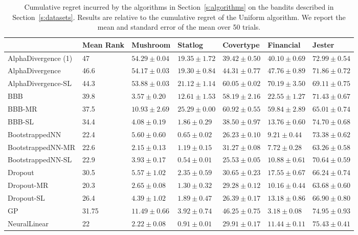 \documentclass{article} \usepackage{iclr2018_conference,times}
\begin{document}
\begin{table}[ht]
  \caption{Cumulative regret incurred by the algorithms in Section~\ref{s:algorithms} on the bandits described in Section~\ref{s:datasets}. Results are relative to the cumulative regret of the Uniform algorithm. We report the mean and standard error of the mean over 50 trials.}
  \label{tab:nonlinear_cum_regret_main}
  \centering
  \footnotesize
  \tiny
  \begin{tabular}{lllllll}
& Mean Rank & Mushroom & Statlog & Covertype & Financial & Jester \\
\midrule
AlphaDivergence (1) & 47& $54.29 \pm 0.04$& $19.35 \pm 1.72$& $39.42 \pm 0.50$& $40.10 \pm 0.69$& $72.99 \pm 0.54$ \\
AlphaDivergence & 46.6& $54.17 \pm 0.03$& $19.30 \pm 0.84$& $44.31 \pm 0.77$& $47.76 \pm 0.89$& $71.86 \pm 0.72$ \\
AlphaDivergence-SL & 44.3& $53.88 \pm 0.03$& $21.12 \pm 1.14$& $60.05 \pm 0.02$& $70.19 \pm 3.50$& $69.11 \pm 0.75$ \\
BBB & 39.8& $3.57 \pm 0.20$& $12.61 \pm 1.53$& $58.19 \pm 2.16$& $22.55 \pm 1.27$& $71.43 \pm 0.67$ \\
BBB-MR & 37.5& $10.93 \pm 2.69$& $25.29 \pm 0.00$& $60.92 \pm 0.55$& $59.84 \pm 2.89$& $65.01 \pm 0.74$ \\
BBB-SL & 34.4& $4.08 \pm 0.19$& $1.86 \pm 0.29$& $38.50 \pm 0.97$& $13.76 \pm 0.60$& $74.70 \pm 0.68$ \\
BootstrappedNN & 22.4& $5.60 \pm 0.60$& $0.65 \pm 0.02$& $26.23 \pm 0.10$& $9.21 \pm 0.44$& $73.38 \pm 0.62$ \\
BootstrappedNN-MR & 22.6& $2.15 \pm 0.13$& $1.19 \pm 0.15$& $31.27 \pm 0.08$& $7.72 \pm 0.28$& $63.26 \pm 0.58$ \\
BootstrappedNN-SL & 22.9& $3.93 \pm 0.17$& $0.54 \pm 0.01$& $25.53 \pm 0.05$& $10.88 \pm 0.61$& $70.64 \pm 0.59$ \\
Dropout & 30.5& $5.57 \pm 1.02$& $2.35 \pm 0.59$& $30.65 \pm 0.23$& $17.55 \pm 0.67$& $66.24 \pm 0.74$ \\
Dropout-MR & 20.3& $2.65 \pm 0.08$& $1.30 \pm 0.32$& $29.28 \pm 0.12$& $10.16 \pm 0.44$& $63.68 \pm 0.60$ \\
Dropout-SL & 26.4& $4.39 \pm 1.02$& $1.89 \pm 0.47$& $26.39 \pm 0.17$& $13.18 \pm 0.86$& $66.90 \pm 0.80$ \\
GP & 31.75& $11.49 \pm 0.66$& $3.92 \pm 0.74$& $46.25 \pm 0.75$& $3.18 \pm 0.08$& $74.95 \pm 0.93$ \\
NeuralLinear & 22& $2.22 \pm 0.08$& $0.91 \pm 0.01$& $29.91 \pm 0.17$& $11.44 \pm 0.11$& $75.43 \pm 0.41$ \\

\end{tabular}
\end{table}
\end{document}
